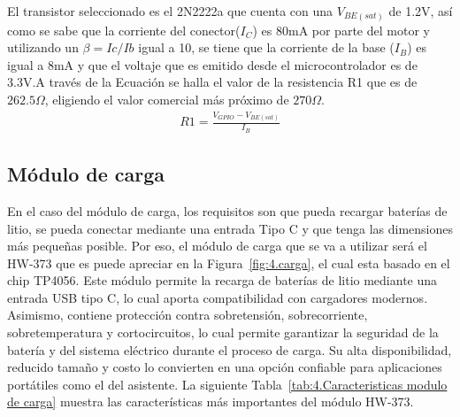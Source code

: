 El transistor seleccionado es el 2N2222a que cuenta con una $V_{BE(sat)}$ de 1.2V, así como se sabe que la corriente del conector($I_C$) es 80mA por parte del motor y utilizando un $\beta=Ic/Ib$ igual a 10, se tiene que la corriente de la base ($I_B$) es igual a 8mA y que el voltaje que es emitido desde el microcontrolador es de 3.3V.A través de la Ecuación se halla el valor de la resistencia R1 que es de $262.5\Omega$, eligiendo el valor comercial más próximo de $270\Omega$.
\begin{align}
\label{ec:4.motor}
R1=\frac{V_{GPIO}-V_{BE(sat)}}{I_B}
\end{align}

\subsection{Módulo de carga}
En el caso del módulo de carga, los requisitos son que pueda recargar baterías de litio, se pueda conectar mediante una entrada Tipo C y que tenga las dimensiones más pequeñas posible. Por eso, el módulo de carga que se va a utilizar será el HW-373 que es puede apreciar en la Figura~\ref{fig:4.carga}, el cual esta basado en el chip TP4056. Este módulo permite la recarga de  baterías de litio mediante una entrada USB tipo C, lo cual aporta compatibilidad con cargadores modernos. Asimismo, contiene protección contra sobretensión, sobrecorriente, sobretemperatura y cortocircuitos, lo cual permite garantizar la seguridad de la batería y del sistema eléctrico durante el proceso de carga. Su alta disponibilidad, reducido tamaño y costo lo convierten en una opción confiable para aplicaciones portátiles como el del asistente. La siguiente Tabla~\ref{tab:4.Caracteristicas modulo de carga} muestra las características más importantes del módulo HW-373.

